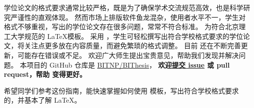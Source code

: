\begin{conclusion}

学位论文的格式要求通常比较严格，既是为了确保学术交流规范高效，也是科学研究严谨性的直观体现。
然而市场上排版软件鱼龙混杂，使用者水平不一，学生对格式不够重视，写出的学位论文存在很多问题，常常不符合标准。
\BIThesis 为符合北京理工大学规范的 \LaTeX 模板。
采用 \BIThesis，学生可轻松撰写出符合学校格式要求的学位论文，将关注点更多放在内容质量，而避免繁琐的格式调整。
目前 \BIThesis 还在不断完善更新，可能存在错误或不足。
欢迎广大师生提出宝贵意见，帮助我们发现并解决问题。
本项目的 GitHub 仓库是 \href{https://github.com/BITNP/BIThesis/}{BITNP/BIThesis}，
\textbf{欢迎\href{https://github.com/BITNP/BIThesis/issues/new/choose}{提交 issue} 或 pull request，帮助 \BIThesis 变得更好。}

希望同学们参考这份指南，能快速掌握如何使用 \BIThesis 模板，写出符合学校格式要求的，并基本了解 \LaTeX。

\end{conclusion}
